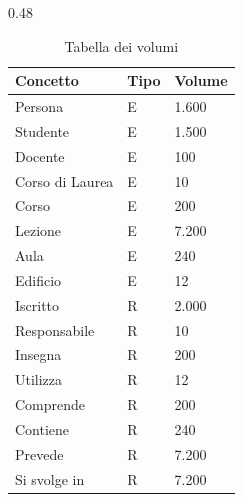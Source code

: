 \documentclass[a4paper,11pt]{article}
\begin{document}
\begin{table}[H]
    \centering
    
    \begin{subtable}{0.48\textwidth}
        \centering
    
        \begin{tabular}{ l l l }
            \toprule
            \textbf{Concetto} & \textbf{Tipo} & \textbf{Volume} \\
            \midrule
            Persona & E & 1.600 \\
            Studente & E & 1.500 \\
            Docente & E & 100 \\
            Corso di Laurea & E & 10 \\
            Corso & E & 200 \\
            Lezione & E & 7.200 \\
            Aula & E & 240 \\
            Edificio & E & 12 \\
            Iscritto & R & 2.000 \\
            Responsabile & R & 10 \\
            Insegna & R & 200 \\
            Utilizza & R & 12 \\
            Comprende & R & 200 \\
            Contiene & R & 240 \\
            Prevede & R & 7.200 \\
            Si svolge in & R & 7.200 \\
            \bottomrule
        \end{tabular}
    
        \caption{Tabella dei volumi}
        \label{tab:volumes}
    

\end{subtable}
\end{table}
\end{document}
